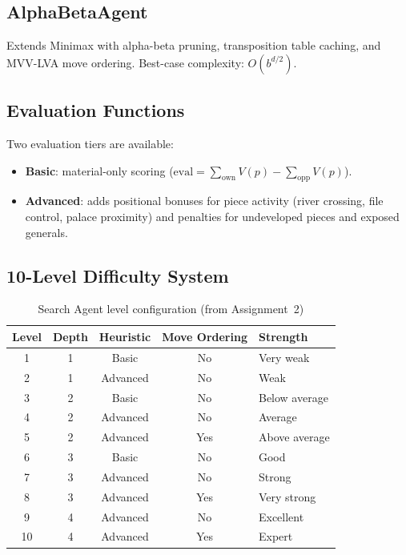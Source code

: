 \documentclass[a4paper,12pt]{article}
\begin{document}
\subsection{AlphaBetaAgent}

Extends Minimax with alpha-beta pruning, transposition table caching, and MVV-LVA move ordering. Best-case complexity: $O(b^{d/2})$.

\subsection{Evaluation Functions}

Two evaluation tiers are available:
\begin{itemize}
    \item \textbf{Basic}: material-only scoring ($\text{eval} = \sum_{\text{own}} V(p) - \sum_{\text{opp}} V(p)$).
    \item \textbf{Advanced}: adds positional bonuses for piece activity (river crossing, file control, palace proximity) and penalties for undeveloped pieces and exposed generals.
\end{itemize}

\subsection{10-Level Difficulty System}

\begin{table}[H]
\centering
\caption{Search Agent level configuration (from Assignment~2)}
\begin{tabular}{@{}ccccl@{}}
\toprule
\textbf{Level} & \textbf{Depth} & \textbf{Heuristic} & \textbf{Move Ordering} & \textbf{Strength} \\
\midrule
1 & 1 & Basic & No & Very weak \\
2 & 1 & Advanced & No & Weak \\
3 & 2 & Basic & No & Below average \\
4 & 2 & Advanced & No & Average \\
5 & 2 & Advanced & Yes & Above average \\
6 & 3 & Basic & No & Good \\
7 & 3 & Advanced & No & Strong \\
8 & 3 & Advanced & Yes & Very strong \\
9 & 4 & Advanced & No & Excellent \\
10 & 4 & Advanced & Yes & Expert \\
\bottomrule
\end{tabular}
\end{table}
\end{document}
